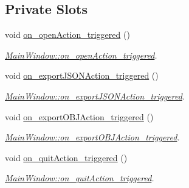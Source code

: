 \subsection*{Private Slots}
\begin{DoxyCompactItemize}
\item 
\mbox{\label{classMainWindow_a6a7d0f1603534dbf0f0cce9d25c404ca}} 
void \hyperlink{classMainWindow_a6a7d0f1603534dbf0f0cce9d25c404ca}{on\+\_\+open\+Action\+\_\+triggered} ()
\begin{DoxyCompactList}\small\item\em \hyperlink{classMainWindow_a6a7d0f1603534dbf0f0cce9d25c404ca}{Main\+Window\+::on\+\_\+open\+Action\+\_\+triggered}. \end{DoxyCompactList}\item 
\mbox{\label{classMainWindow_a6b03e4756312ca0a16e0e7a5dad44f28}} 
void \hyperlink{classMainWindow_a6b03e4756312ca0a16e0e7a5dad44f28}{on\+\_\+export\+J\+S\+O\+N\+Action\+\_\+triggered} ()
\begin{DoxyCompactList}\small\item\em \hyperlink{classMainWindow_a6b03e4756312ca0a16e0e7a5dad44f28}{Main\+Window\+::on\+\_\+export\+J\+S\+O\+N\+Action\+\_\+triggered}. \end{DoxyCompactList}\item 
\mbox{\label{classMainWindow_ab8ba1290a053f8679451426544a0a955}} 
void \hyperlink{classMainWindow_ab8ba1290a053f8679451426544a0a955}{on\+\_\+export\+O\+B\+J\+Action\+\_\+triggered} ()
\begin{DoxyCompactList}\small\item\em \hyperlink{classMainWindow_ab8ba1290a053f8679451426544a0a955}{Main\+Window\+::on\+\_\+export\+O\+B\+J\+Action\+\_\+triggered}. \end{DoxyCompactList}\item 
\mbox{\label{classMainWindow_a048e09a91f6e0d7cf424be5aa32cd49e}} 
void \hyperlink{classMainWindow_a048e09a91f6e0d7cf424be5aa32cd49e}{on\+\_\+quit\+Action\+\_\+triggered} ()
\begin{DoxyCompactList}\small\item\em \hyperlink{classMainWindow_a048e09a91f6e0d7cf424be5aa32cd49e}{Main\+Window\+::on\+\_\+quit\+Action\+\_\+triggered}. \end{DoxyCompactList}\item 

\end{DoxyCompactItemize}
